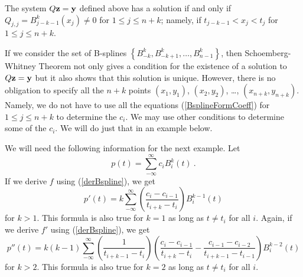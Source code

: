 \begin{prop}
The system $Q\mathbf{z} = \mathbf{y}$ defined above has a solution if and
only if $Q_{j,j} = B_{j-k-1}^k(x_j) \neq 0$ for $1\leq j \leq n+k$;
namely, if $t_{j-k-1} < x_j < t_j$ for $1\leq j \leq n+k$.
\end{prop}

If we consider the set of B-splines
$\displaystyle \left\{ B_{-k}^k, B_{-k+1}^k, \ldots , B_{n-1}^k \right\}$,
then Schoemberg-Whitney Theorem not only gives a condition for the
existence of a solution to $Q\mathbf{z} = \mathbf{y}$ but it also shows that
this solution is unique.  However, there is no obligation to specify
all the $n+k$ points $(x_1,y_1)$, $(x_2,y_2)$, \ldots,
$(x_{n+k},y_{n+k})$.   Namely, we do not have to use all the equations
(\ref{BsplineFormCoeff}) for $1\leq j \leq n+ k$ to determine the
$c_i$.  We may use other conditions to determine some of the
$c_i$.  We will do just that in an example below.

\begin{rmk}
We will need the following information for the next example.  Let
\[
  p(t) = \sum_{-\infty}^\infty c_i B_i^k(t) \ .
\]
If we derive $f$ using (\ref{derBspline}), we get
\[
p'(t) = k\sum_{-\infty}^\infty \left(\frac{c_i - c_{i-1}}{t_{i+k}-t_i}\right)
B_i^{k-1}(t)
\]
for $k>1$.  This formula is also true for $k=1$ as long as $t\neq t_i$
for all $i$.  Again, if we derive $f'$ using (\ref{derBspline}), we get
\[
p''(t) = k(k-1)
\sum_{-\infty}^\infty\left(\frac{1}{t_{i+k-1}-t_i}\right)
\left(\frac{c_i - c_{i-1}}{t_{i+k}-t_i}
- \frac{c_{i-1} - c_{i-2}}{t_{i+k-1}-t_{i-1}}
\right) B_i^{k-2}(t)
\]
for $k>2$.  This formula is also true for $k=2$ as long as $t\neq t_i$
for all $i$.
\end{rmk}

